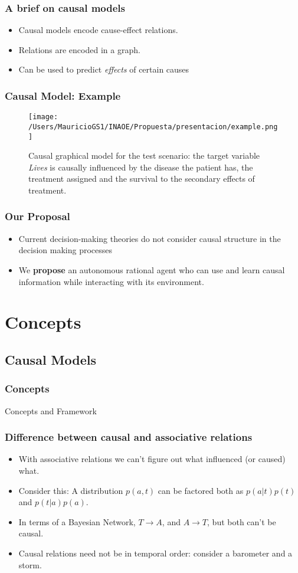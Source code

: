 \documentclass{beamer}
\theoremstyle{plain}
\begin{document}
\begin{frame}
\frametitle{A brief on causal models}
\begin{itemize}
\item Causal models encode cause-effect relations. 
\item Relations are encoded in a graph.
\item Can be used to predict \textit{effects} of certain causes
\end{itemize}
\end{frame}

\begin{frame}
\frametitle{Causal Model: Example}
\begin{figure}[ht]
\vskip 0.2in
\begin{center}
\texttt{[image: /Users/MauricioGS1/INAOE/Propuesta/presentacion/example.png]}
\caption{Causal graphical model for the test scenario: the target variable \textit{Lives} is causally influenced by the disease the patient has, the treatment assigned and the survival to the secondary effects of treatment.}
\label{causal_model}
\end{center}
\vskip -0.2in
\end{figure}
\end{frame}

\begin{frame}
\frametitle{Our Proposal}
\begin{itemize}
\item Current decision-making theories do not consider causal structure in the decision making processes
\item We \textbf{propose} an autonomous rational agent who can use and learn causal information while interacting with its environment.
\end{itemize}
\end{frame}

\section{Concepts}
\subsection{Causal Models}
\begin{frame}
\frametitle{Concepts}
Concepts and Framework
\end{frame}
		\begin{frame}
		\frametitle{Difference between causal and associative relations}
		\begin{itemize}
		\item With associative relations we can't figure out what influenced (or caused) what.
		\item Consider this: A distribution $p(a,t)$ can be factored both as $p(a|t)p(t)$ and $p(t|a)p(a)$. 
		\item In terms of a Bayesian Network, $T \to A$, and $A \to T$, but both can't be causal.
		\item Causal relations need not be in temporal order: consider a barometer and a storm.
		\end{itemize}
		\end{frame}
		
\end{document}
